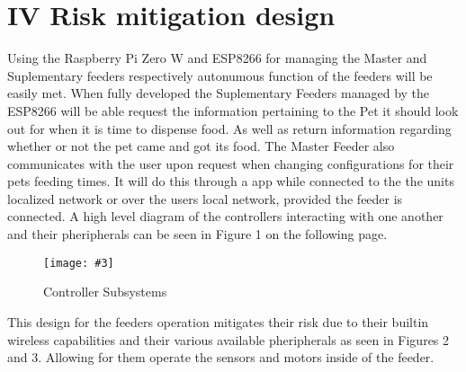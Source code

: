 \documentclass[12pt]{article}
\newcounter{engineering}
\newcommand{\nimg}[4][width=\textwidth]{
    \begin{figure}[H]
        \centering
        \texttt{[image: \#3]}
        \caption{#4}
        \label{#2}
    \end{figure}
}
\begin{document}
\section{IV Risk mitigation design}

Using the Raspberry Pi Zero W and ESP8266 for managing the Master and
Suplementary feeders respectively autonumous function of the feeders will be easily met.
When fully developed the Suplementary Feeders managed by the ESP8266 will be able request
the information pertaining to the Pet it should look out for when it is time to dispense food.
As well as return information regarding whether or not the pet came and got its food.  The
Master Feeder also communicates with the user upon request when changing configurations
for their pets feeding times.  It will do this through a app while connected to the the units
localized network or over the users local network, provided the feeder is connected.  A high
level diagram of the controllers interacting with one another and their pheripherals can be seen in Figure 1 on
the following page.

    \nimg [height = 3.00 in]{Risk}{pics/subsystems.png}{Controller Subsystems}

This design for the feeders operation mitigates their risk due to their builtin wireless capabilities and
their various available pheripherals as seen in Figures 2 and 3.  Allowing for them operate the sensors
and motors inside of the feeder.
\end{document}
